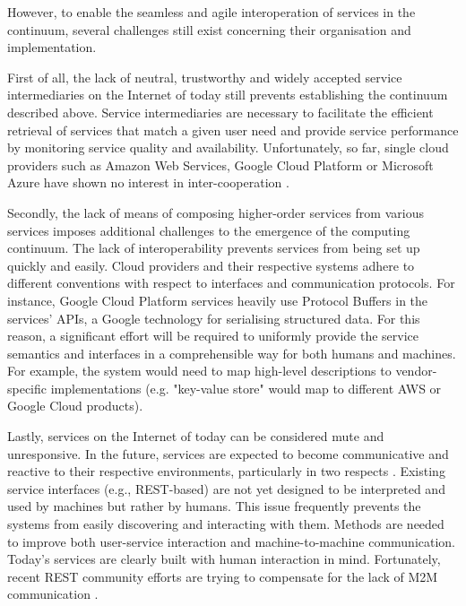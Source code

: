 However, to enable the seamless and agile interoperation of services in the continuum, several challenges still exist concerning their organisation and implementation.

First of all, the lack of neutral, trustworthy and widely accepted service intermediaries on the Internet of today still prevents establishing the continuum described above. Service intermediaries are necessary to facilitate the efficient retrieval of services that match a given user need and provide service performance by monitoring service quality and availability. Unfortunately, so far, single cloud providers such as Amazon Web Services, Google Cloud Platform or Microsoft Azure have shown no interest in inter-cooperation \cite{grozev2014inter}.

Secondly, the lack of means of composing higher-order services from various services imposes additional challenges to the emergence of the computing continuum. The lack of interoperability prevents services from being set up quickly and easily. Cloud providers and their respective systems adhere to different conventions with respect to interfaces and communication protocols. For instance, Google Cloud Platform services heavily use Protocol Buffers \cite{protobuf} in the services' APIs, a Google technology for serialising structured data. For this reason, a significant effort will be required to uniformly provide the service semantics and interfaces in a comprehensible way for both humans and machines. For example, the system would need to map high-level descriptions to vendor-specific implementations (e.g. "key-value store" would map to different AWS or Google Cloud products).

Lastly, services on the Internet of today can be considered mute and unresponsive. In the future, services are expected to become communicative and reactive to their respective environments, particularly in two respects \cite{haller2008internet}. Existing service interfaces (e.g., REST-based) are not yet designed to be interpreted and used by machines but rather by humans. This issue frequently prevents the systems from easily discovering and interacting with them. Methods are needed to improve both user-service interaction and machine-to-machine communication. Today's services are clearly built with human interaction in mind. Fortunately, recent REST community efforts are trying to compensate for the lack of M2M communication \cite{openapi}.


